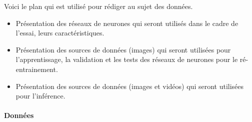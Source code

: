 \par Voici le plan qui est utilisé pour rédiger au sujet des données.
\begin{itemize}
   \item Présentation des réseaux de neurones qui seront utilisés dans le cadre de l’essai, leurs caractéristiques.
   \item Présentation des sources de données (images) qui seront utilisées pour l'apprentissage, la validation et les tests des réseaux de neurones pour le ré-entrainement.
   \item Présentation des sources de données (images et vidéos) qui seront utilisées pour l'inférence.
\end{itemize}

\paragraph{Données}\label{metho:data}

